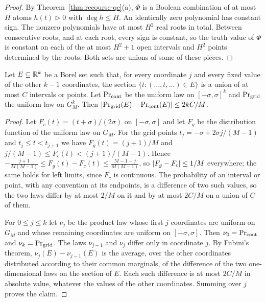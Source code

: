 \begin{proof}
By Theorem~\ref{thm:recourse-qe}(a), $\Phi$ is a Boolean combination of
at most $H$ atoms $h(t)\vartriangleright0$ with $\deg h\le H$. An
identically zero polynomial has constant sign. The nonzero polynomials
have at most $H^2$ real roots in total. Between consecutive roots, and
at each root, every sign is constant, so the truth value of $\Phi$ is
constant on each of the at most $H^2+1$ open intervals and $H^2$ points
determined by the roots. Both sets are unions of some of these pieces.
\end{proof}

\begin{lemma}
\label{lem:recourse-replacement}
Let $E\subseteq\mathbb R^k$ be a Borel set such that, for every coordinate
$j$ and every fixed value of the other $k-1$ coordinates, the section
$\{t:(\ldots,t,\ldots)\in E\}$ is a union of at most $C$ intervals or
points. Let $\Pr_{\rm cont}$ be the uniform law on $[-\sigma,\sigma]^k$
and $\Pr_{\rm grid}$ the uniform law on $G_M^k$. Then
$\left\lvert\Pr_{\rm grid}(E)-\Pr_{\rm cont}(E)\right\rvert\le2kC/M$.
\end{lemma}

\begin{proof}
Let $F_c(t)=(t+\sigma)/(2\sigma)$ on $[-\sigma,\sigma]$ and let $F_g$
be the distribution function of the uniform law on $G_M$. For the grid
points $t_j=-\sigma+2\sigma j/(M-1)$ and
$t_j\le t<t_{j+1}$ we have $F_g(t)=(j+1)/M$ and
$j/(M-1)\le F_c(t)<(j+1)/(M-1)$. Hence
$-\frac{j+1}{M(M-1)}\le F_g(t)-F_c(t)\le\frac{M-1-j}{M(M-1)}$, so
$\left\lvert F_g-F_c\right\rvert\le1/M$ everywhere; the same holds for left limits, since
$F_c$ is continuous. The probability of an interval or point, with any
convention at its endpoints, is a difference of two such values, so
the two laws differ by at most $2/M$ on it and by at most $2C/M$ on a
union of $C$ of them.

For $0\le j\le k$ let $\nu_j$ be the product law whose first $j$
coordinates are uniform on $G_M$ and whose remaining coordinates are
uniform on $[-\sigma,\sigma]$. Then $\nu_0=\Pr_{\rm cont}$ and
$\nu_k=\Pr_{\rm grid}$. The laws $\nu_{j-1}$ and $\nu_j$ differ only in
coordinate $j$. By Fubini's theorem, $\nu_j(E)-\nu_{j-1}(E)$ is the
average, over the other coordinates distributed according to their
common marginals, of the difference of the two one-dimensional laws on
the section of $E$. Each such difference is at most $2C/M$ in absolute
value, whatever the values of the other coordinates. Summing over $j$
proves the claim.
\end{proof}

